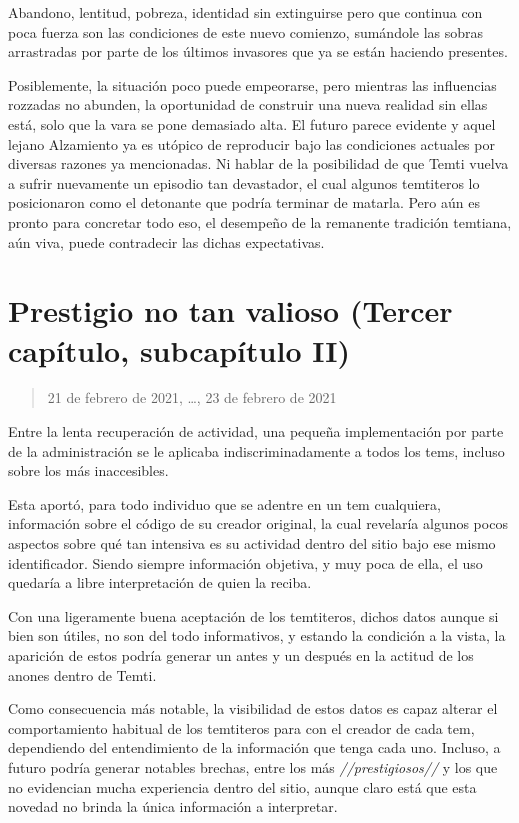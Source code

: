 \documentclass[
  spanish,
]{book}
\begin{document}
Abandono, lentitud, pobreza, identidad sin extinguirse pero que continua con poca fuerza son las condiciones de este nuevo comienzo, sumándole las sobras arrastradas por parte de los últimos invasores que ya se están haciendo presentes.

Posiblemente, la situación poco puede empeorarse, pero mientras las influencias rozzadas no abunden, la oportunidad de construir una nueva realidad sin ellas está, solo que la vara se pone demasiado alta.
El futuro parece evidente y aquel lejano Alzamiento ya es utópico de reproducir bajo las condiciones actuales por diversas razones ya mencionadas. Ni hablar de la posibilidad de que Temti vuelva a sufrir nuevamente un episodio tan devastador, el cual algunos temtiteros lo posicionaron como el detonante que podría terminar de matarla.
Pero aún es pronto para concretar todo eso, el desempeño de la remanente tradición temtiana, aún viva, puede contradecir las dichas expectativas.

\hypertarget{prestigio-no-tan-valioso-tercer-capuxedtulo-subcapuxedtulo-ii}{%
\section{Prestigio no tan valioso (Tercer capítulo, subcapítulo II)}\label{prestigio-no-tan-valioso-tercer-capuxedtulo-subcapuxedtulo-ii}}

\begin{quote}
21 de febrero de 2021, \ldots, 23 de febrero de 2021
\end{quote}

Entre la lenta recuperación de actividad, una pequeña implementación por parte de la administración se le aplicaba indiscriminadamente a todos los tems, incluso sobre los más inaccesibles.

Esta aportó, para todo individuo que se adentre en un tem cualquiera, información sobre el código de su creador original, la cual revelaría algunos pocos aspectos sobre qué tan intensiva es su actividad dentro del sitio bajo ese mismo identificador. Siendo siempre información objetiva, y muy poca de ella, el uso quedaría a libre interpretación de quien la reciba.

Con una ligeramente buena aceptación de los temtiteros, dichos datos aunque si bien son útiles, no son del todo informativos, y estando la condición a la vista, la aparición de estos podría generar un antes y un después en la actitud de los anones dentro de Temti.

Como consecuencia más notable, la visibilidad de estos datos es capaz alterar el comportamiento habitual de los temtiteros para con el creador de cada tem, dependiendo del entendimiento de la información que tenga cada uno. Incluso, a futuro podría generar notables brechas, entre los más \emph{//prestigiosos//} y los que no evidencian mucha experiencia dentro del sitio, aunque claro está que esta novedad no brinda la única información a interpretar.
\end{document}
